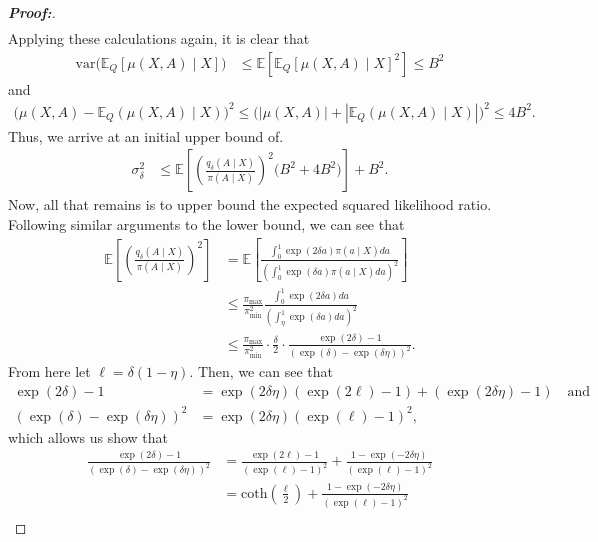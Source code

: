 \documentclass[11pt,twoside]{article}
\newcommand{\var}{\text{var}}
\theoremstyle{definition}
\theoremstyle{remark}
\begin{document}
\begin{proof}[\textbf{Proof:}]
\begin{align*}
\end{align*}
Applying these calculations again, it is clear that
\begin{align*}
    \var\Big( \mathbb{E}_Q\left[\mu(X, A) \mid X \right] \Big) &\leq \mathbb{E}\left[ \mathbb{E}_Q\left[\mu(X, A) \mid X \right]^2 \right]  \leq B^2
\end{align*}
and
\begin{align*}
    \Big( \mu(X, A) - \mathbb{E}_Q(\mu(X, A) \mid X) \Big)^2 \leq  \Big(\left|\mu(X, A)\right| + \left|\mathbb{E}_Q(\mu(X, A) \mid X)\right|  \Big)^2 \leq 4B^2.
\end{align*}
Thus, we arrive at an initial upper bound of.
\begin{align*}
    \sigma^2_\delta &\leq \mathbb{E}\left[\left(\frac{q_\delta(A \mid X)}{\pi(A \mid X)}\right)^2 \Big( B^2 + 4B^2 \Big) \right] + B^2.
\end{align*}
Now, all that remains is to upper bound the expected squared likelihood ratio. Following similar arguments to the lower bound, we can see that
\begin{align*}
    \mathbb{E}\left[\left(\frac{q_\delta(A \mid X)}{\pi(A \mid X)}\right)^2 \right] &= \mathbb{E}\left[\frac{\int^1_0 \exp(2 \delta a) \pi(a \mid X) da}{\left(\int^1_0 \exp(\delta a) \pi(a \mid X) da \right)^2} \right] \\
    &\leq \frac{\pi_{\max}}{\pi^2_{\min}}\frac{\int^1_0 \exp(2 \delta a) da}{\left(\int^1_\eta \exp(\delta a) da \right)^2} \\
    &\leq \frac{\pi_{\max}}{\pi^2_{\min}} \cdot \frac{\delta}{2} \cdot \frac{\exp(2 \delta) - 1}{\left(\exp(\delta) - \exp(\delta \eta) \right)^2}.
\end{align*}
From here let $\ell = \delta(1 - \eta)$. Then, we can see that
\begin{align*}
    \exp(2 \delta) - 1 &= \exp(2 \delta \eta)( \exp(2 \ell) - 1) + ( \exp(2 \delta \eta) - 1) \quad \text{and} \\
    \left(\exp(\delta) - \exp(\delta \eta) \right)^2 &= \exp(2 \delta \eta) (\exp(\ell) - 1)^2,
\end{align*}
which allows us show that
\begin{align*}
    \frac{\exp(2 \delta) - 1}{\left(\exp(\delta) - \exp(\delta \eta) \right)^2} &= \frac{\exp(2 \ell) - 1}{(\exp(\ell) - 1)^2} + \frac{1 - \exp(- 2 \delta \eta )}{(\exp(\ell) - 1)^2} \\
    &= \text{coth}\left( \frac{\ell}{2} \right) +  \frac{1 - \exp(- 2 \delta \eta )}{(\exp(\ell) - 1)^2} \\

\end{align*}
\end{proof}
\end{document}
